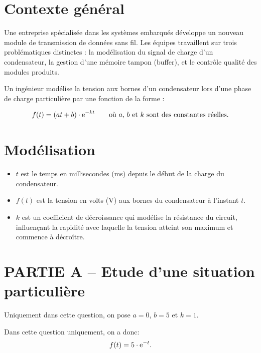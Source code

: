 
\pagestyle{DS_FP}

\bigskip


\section*{Contexte général}

Une entreprise spécialisée dans les systèmes embarqués développe un nouveau module de transmission de données sans fil. Les équipes travaillent sur trois problématiques distinctes : la modélisation du signal de charge d’un condensateur, la gestion d’une mémoire tampon (buffer), et le contrôle qualité des modules produits.

Un ingénieur modélise la tension aux bornes d’un condensateur lors d’une phase de charge particulière par une fonction de la forme :

\[f(t)=(at+b)\cdot \mathrm{e}^{-kt}\qquad \text{où $a$, $b$ et $k$ sont des constantes réelles.}\]

\section*{Modélisation}

\begin{itemize}
    \item $t$ est le temps en millisecondes (ms) depuis le début de la charge du condensateur.
    \item $f(t)$ est la tension en volts (V) aux bornes du condensateur à l’instant $t$.
    \item $k$ est un coefficient de décroissance qui modélise la résistance du circuit, influençant la rapidité avec laquelle la tension atteint son maximum et commence à décroître.
\end{itemize}

\section*{PARTIE A -- Etude d'une situation particulière}

Uniquement dans cette question, on pose $a=0$, $b=5$ et $k=1$.

Dans cette question uniquement, on a donc:
\[f(t)=5\cdot \mathrm{e}^{-t}.\]

